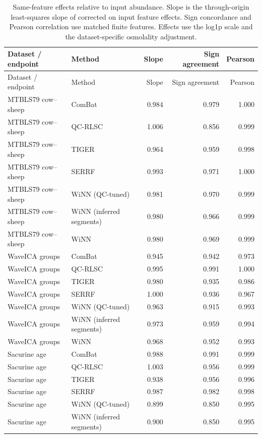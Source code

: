 \scriptsize
\begin{longtable}{llrrr}
\caption{Same-feature effects relative to input abundance. Slope is the through-origin least-squares slope of corrected on input feature effects. Sign concordance and Pearson correlation use matched finite features. Effects use the log1p scale and the dataset-specific osmolality adjustment.}\label{tab:supp_paired_effects}\\
\toprule
Dataset / endpoint & Method & Slope & Sign agreement & Pearson \\
\midrule
\endfirsthead
\toprule
Dataset / endpoint & Method & Slope & Sign agreement & Pearson \\
\midrule
\endhead
\bottomrule
\endlastfoot
MTBLS79 cow--sheep & ComBat & 0.984 & 0.979 & 1.000 \\
MTBLS79 cow--sheep & QC-RLSC & 1.006 & 0.856 & 0.999 \\
MTBLS79 cow--sheep & TIGER & 0.964 & 0.959 & 0.998 \\
MTBLS79 cow--sheep & SERRF & 0.993 & 0.971 & 1.000 \\
MTBLS79 cow--sheep & WiNN (QC-tuned) & 0.981 & 0.970 & 0.999 \\
MTBLS79 cow--sheep & WiNN (inferred segments) & 0.980 & 0.966 & 0.999 \\
MTBLS79 cow--sheep & WiNN & 0.980 & 0.969 & 0.999 \\
WaveICA groups & ComBat & 0.945 & 0.942 & 0.973 \\
WaveICA groups & QC-RLSC & 0.995 & 0.991 & 1.000 \\
WaveICA groups & TIGER & 0.980 & 0.935 & 0.986 \\
WaveICA groups & SERRF & 1.000 & 0.936 & 0.967 \\
WaveICA groups & WiNN (QC-tuned) & 0.963 & 0.915 & 0.993 \\
WaveICA groups & WiNN (inferred segments) & 0.973 & 0.959 & 0.994 \\
WaveICA groups & WiNN & 0.968 & 0.952 & 0.993 \\
Sacurine age & ComBat & 0.988 & 0.991 & 0.999 \\
Sacurine age & QC-RLSC & 1.003 & 0.956 & 0.999 \\
Sacurine age & TIGER & 0.938 & 0.956 & 0.996 \\
Sacurine age & SERRF & 0.987 & 0.982 & 0.998 \\
Sacurine age & WiNN (QC-tuned) & 0.899 & 0.850 & 0.995 \\
Sacurine age & WiNN (inferred segments) & 0.900 & 0.850 & 0.995 \\

\end{longtable}

